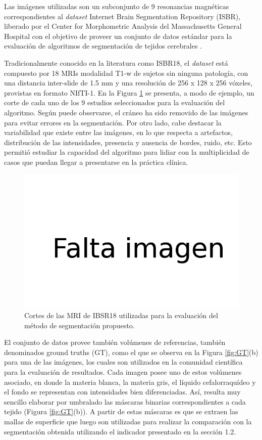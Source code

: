 Las imágenes utilizadas son un subconjunto de 9 resonancias magnéticas correspondientes al \emph{dataset} Internet Brain Segmentation Repository (ISBR), liberado por el Center for Morphometric Analysis del Massachusetts General Hospital con el objetivo de proveer un conjunto de datos estándar para la evaluación de algoritmos de segmentación de tejidos cerebrales \citep{rohlfing2012image, valverde2015comparison}. 

Tradicionalmente conocido en la literatura como ISBR18, el \emph{dataset} está compuesto por 18 MRIs modalidad T1-w de sujetos sin ninguna patología, con una distancia inter-slide de 1.5 mm y una resolución de 256 x 128 x 256 vóxeles, provistas en formato NIfTI-1. En la Figura \ref{fig:ISBR18} se presenta, a modo de ejemplo, un corte de cada uno de los 9 estudios seleccionados para la evaluación del algoritmo. Según puede observarse, el cráneo ha sido removido de las imágenes para evitar errores en la segmentación. Por otro lado, cabe destacar la variabilidad que existe entre las imágenes, en lo que respecta a artefactos, distribución de las intensidades, presencia y ausencia de bordes, ruido, etc. Esto permitió estudiar la capacidad del algoritmo para lidiar con la multiplicidad de casos que puedan llegar a presentarse en la práctica clínica.

\begin{figure}[H]
	\centering
	\includegraphics[scale=0.7]{images/FALTA.png}
	\caption{Cortes de las MRI de IBSR18 utilizadas para la evaluación del método de segmentación propuesto.}
	\label{fig:ISBR18}
\end{figure}

El conjunto de datos provee también volúmenes de referencias, también denominados ground truths (GT), como el que se observa en la Figura \ref{fig:GT}(b) para una de las imágenes, los cuales son utilizados en la comunidad científica para la evaluación de resultados. Cada imagen posee uno de estos volúmenes asociado, en donde la materia blanca, la materia gris, el líquido cefalorraquídeo y el fondo se representan con intensidades bien diferenciadas. Así, resulta muy sencillo elaborar por umbralado las máscaras binarias correspondientes a cada tejido (Figura \ref{fig:GT}(b)). A partir de estas máscaras es que se extraen las mallas de superficie que luego son utilizadas para realizar la comparación con la segmentación obtenida utilizando el indicador presentado en la sección 1.2.

